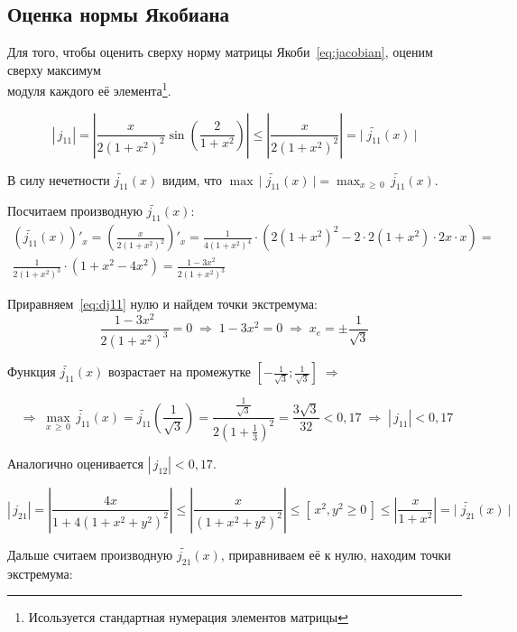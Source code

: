 \documentclass[a4paper,12pt]{article}
\begin{document}
\newpage
\subsection{Оценка нормы Якобиана}
\par\bigskip
Для того, чтобы оценить сверху норму матрицы Якоби~\eqref{eq:jacobian},
оценим сверху максимум \\ модуля каждого её элемента\footnote{
Исользуется стандартная нумерация элементов матрицы}. 
\par\bigskip
$$
    \left|\, j_{11} \right| =
    \left| \frac x{2(1+x^2)^2} \sin\left(\frac2{1+x^2}\right) \right| \leq
    \left| \frac x{2(1+x^2)^2} \right| =
    \lvert \;\widetilde{j_{11}} (x) \:\rvert
$$
\par\bigskip
В силу нечетности $\widetilde{j_{11}} (x)$ видим, что 
$
    \max\,\lvert \;\widetilde{j_{11}} (x) \:\rvert = 
    \max_{x\,\geq\,0 }\,\widetilde{j_{11}}(x) .
$
\par\bigskip
Посчитаем производную $\widetilde{j_{11}}(x)$:
\begin{equation}\begin{split}\label{eq:dj11}
    \left(\widetilde{j_{11}}(x) \right)'_x =
    \left(\frac x{2(1+x^2)^2} \right)'_x =
    \frac 1{4(1+x^2)^4} \cdot \left( 2(1+x^2)^2 - 2 \cdot 2(1+x^2) 
    \cdot 2x \cdot x\right) = \\
    \frac 1{2(1+x^2)^3} \cdot \left( 1+x^2-4x^2 \right) =
    \frac {1-3x^2}{2(1+x^2)^3}
\end{split}\end{equation}

Приравняем~\eqref{eq:dj11} нулю и найдем точки экстремума:
$$
    \frac {1-3x^2}{2(1+x^2)^3} = 0 \;\Rightarrow\;
    1-3x^2 = 0 \;\Rightarrow\; x_e = \pm \frac 1{\sqrt{3}}
$$

Функция $\widetilde{j_{11}}(x)$ возрастает на промежутке 
$ \left[-\frac 1{\sqrt{3}} ; \frac 1{\sqrt{3}}  \right] \;\Rightarrow\; $

$$
    \;\Rightarrow\;
    \max_{x\,\geq\,0 }\,\widetilde{j_{11}}(x) = 
    \widetilde{j_{11}} \left( \frac 1{\sqrt{3}} \right) =
    \frac { \frac 1{\sqrt{3}} }{2(1+\frac13)^2} = 
    \frac{3\sqrt{3}}{32} < 0,17 \;\Rightarrow\;
    \left|\, j_{11} \right| < 0,17
$$

\par\bigskip
Аналогично оценивается $\left|\, j_{12} \right| < 0,17 $.
\par\bigskip\par\bigskip
$$
    \left|\, j_{21} \right| =
    \left| \frac{4x}{1+4(1+x^2+y^2)^2} \right| \leq
    \left| \frac{x}{(1+x^2+y^2)^2} \right| \leq
    \left[\,x^2, y^2 \geq 0 \,\right] \leq
    \left| \frac{x}{1+x^2} \right| =
    \lvert \;\widetilde{j_{21}} (x) \:\rvert
$$
\par\bigskip
Дальше считаем производную $\widetilde{j_{21}}(x)$, приравниваем её к нулю, 
находим точки экстремума:
\end{document}
